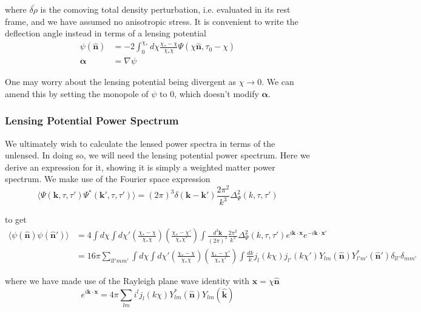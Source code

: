\documentclass[a4paper,10pt]{article}
\renewcommand{\v}[1]{\mathbf{#1}}
\newcommand{\fint}[1]{\int \frac{d^3 \v{#1}}{(2\pi)^3}}
\newcommand{\unit}[1]{\hat{\v{#1}}}
\begin{document}
where $\bar{\delta\rho}$ is the comoving total density perturbation, i.e. evaluated in its rest frame, and we have assumed no anisotropic stress. It is convenient to write the deflection angle instead in terms of a lensing potential
\begin{equation}\begin{split}
\psi(\unit{n}) &= -2 \int_0^{\chi_*}d\chi \frac{\chi_*-\chi}{\chi_*\chi}\Psi(\chi\unit{n},\tau_0-\chi)\\
\boldsymbol{\alpha} &= \nabla \psi
\end{split}\end{equation}

One may worry about the lensing potential being divergent as $\chi \rightarrow 0$. We can amend this by setting the monopole of $\psi$ to 0, which doesn't modify $\boldsymbol{\alpha}$. 

\subsubsection{Lensing Potential Power Spectrum}

We ultimately wish to calculate the lensed power spectra in terms of the unlensed. In doing so, we will need the lensing potential power spectrum. Here we derive an expression for it, showing it is simply a weighted matter power spectrum. We make use of the Fourier space expression
\begin{equation}
\langle \Psi(\v{k},\tau,\tau')\Psi^*(\v{k}',\tau,\tau')\rangle=(2\pi)^3\delta(\v{k}-\v{k}')\frac{2\pi^2}{k^3}\Delta^2_\Psi(k,\tau,\tau')
\end{equation}

to get 
\begin{equation}\begin{split}
\langle \psi(\unit{n})\psi(\unit{n}') \rangle &= 4\int d\chi \int d\chi'(\frac{\chi_*-\chi}{\chi_*\chi})(\frac{\chi_*-\chi'}{\chi_*\chi'})\fint{k}\frac{2\pi^2}{k^3}\Delta^2_\Psi(k,\tau,\tau')e^{i\v{k}\cdot\v{x}}e^{-i\v{k}\cdot\v{x'}}\\
&= 16\pi \sum_{ll'mm'}\int d\chi \int d\chi'(\frac{\chi_*-\chi}{\chi_*\chi})(\frac{\chi_*-\chi'}{\chi_*\chi'})\int \frac{dk}{k}j_l(k\chi)j_{l'}(k\chi')Y_{lm}(\unit{n})Y^*_{l'm'}(\unit{n}')\delta_{ll'}\delta_{mm'}
\end{split}\end{equation}

where we have made use of the Rayleigh plane wave identity with $\v{x}=\chi\unit{n}$
\begin{equation}
e^{i\v{k}\cdot\v{x}} = 4\pi\sum_{lm}i^lj_l(k\chi)Y_{lm}^*(\unit{n})Y_{lm}(\unit{k})
\end{equation}
\end{document}
